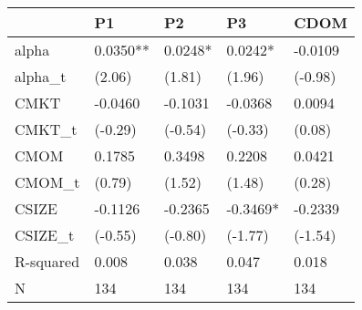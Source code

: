 \begin{tabular}{lllll}
\toprule
 & P1 & P2 & P3 & CDOM \\
\midrule
alpha & 0.0350** & 0.0248* & 0.0242* & -0.0109 \\
alpha_t & (2.06) & (1.81) & (1.96) & (-0.98) \\
CMKT & -0.0460 & -0.1031 & -0.0368 & 0.0094 \\
CMKT_t & (-0.29) & (-0.54) & (-0.33) & (0.08) \\
CMOM & 0.1785 & 0.3498 & 0.2208 & 0.0421 \\
CMOM_t & (0.79) & (1.52) & (1.48) & (0.28) \\
CSIZE & -0.1126 & -0.2365 & -0.3469* & -0.2339 \\
CSIZE_t & (-0.55) & (-0.80) & (-1.77) & (-1.54) \\
R-squared & 0.008 & 0.038 & 0.047 & 0.018 \\
N & 134 & 134 & 134 & 134 \\
\bottomrule
\end{tabular}
